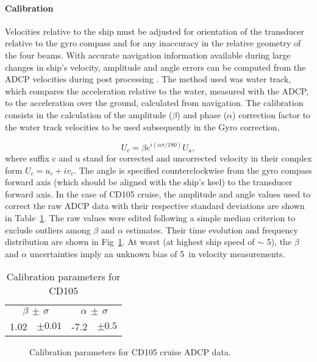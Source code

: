 \paragraph{Calibration}\label{sec:springcal} Velocities relative to the ship must be adjusted
for orientation of the transducer relative to the gyro compass and
for any inaccuracy in the relative geometry of the four beams.
With accurate navigation information available during large
changes in ship's velocity, amplitude and angle errors can be
computed from the ADCP velocities during post processing
\citep{Pollard89}. The method used was water track, which compares
the acceleration relative to the water, measured with the ADCP, to
the acceleration over the ground, calculated from navigation. The
calibration consists in the calculation of the amplitude ($\beta$)
and phase ($\alpha$) correction factor to the water track
velocities to be used subsequently in the Gyro correction,

\begin{equation}\label{eq:watertrack}
  U_c=\beta e^{i(\alpha \pi/180)}U_u,
\end{equation}
where suffix c and u stand for corrected and uncorrected velocity
in their complex form $U_c=u_c+iv_c$. The angle is specified
counterclockwise from the gyro compass forward axis (which should
be aligned with the ship's keel) to the transducer forward axis.
In the case of CD105 cruise, the amplitude and angle values used
to correct the raw ADCP data with their respective standard
deviations are shown in Table~\ref{tb:cd105cal}. The raw values
were edited following a simple median criterion to exclude
outliers among $\beta$ and $\alpha$ estimates. Their time
evolution and frequency distribution are shown in
Fig~\ref{fig:cd105cal}. At worst (at highest ship speed of $\sim$
5\vel), the $\beta$ and $\alpha$ uncertainties imply an unknown
bias of 5\velc\, in velocity measurements.
\begin{table}[h]
  \centering
\begin{tabular}{llll}
\hline \hline
\multicolumn{2}{c}{$\beta \, \pm \, \sigma$} &
\multicolumn{2}{c}{$\alpha \, \pm \, \sigma$} \\ \cline{1-4}
1.02 & $\pm 0.01$ & -7.2 & $\pm 0.5 $\\
\hline \hline
\end{tabular}
  \caption{Calibration parameters for CD105}\label{tb:cd105cal}
\end{table}
\begin{figure}[t]
\begin{center}
\caption{Calibration parameters for CD105 cruise ADCP data.}
\label{fig:cd105cal}
\end{center}
\end{figure}


